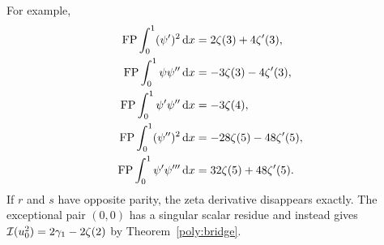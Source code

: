 For example,
\begin{align}
 \operatorname{FP}\int_0^1(\psi')^2\,\mathrm d x&=2\zeta(3)+4\zeta'(3),\label{poly:trigamma2}\\
 \operatorname{FP}\int_0^1\psi\psi''\,\mathrm d x&=-3\zeta(3)-4\zeta'(3),\\
 \operatorname{FP}\int_0^1\psi'\psi''\,\mathrm d x&=-3\zeta(4),\\
 \operatorname{FP}\int_0^1(\psi'')^2\,\mathrm d x&=-28\zeta(5)-48\zeta'(5),\\
 \operatorname{FP}\int_0^1\psi'\psi'''\,\mathrm d x&=32\zeta(5)+48\zeta'(5).
\end{align}
If $r$ and $s$ have opposite parity, the zeta derivative disappears
exactly. The exceptional pair $(0,0)$ has a singular scalar residue
and instead gives $\mathcal I(u_0^2)=2\gamma_1-2\zeta(2)$ by
Theorem~\ref{poly:bridge}.
